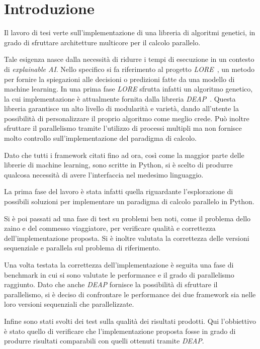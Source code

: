 \chapter*{Introduzione}

Il lavoro di tesi verte sull'implementazione di una libreria di algoritmi
genetici, in grado di sfruttare architetture multicore per il calcolo parallelo.

Tale esigenza nasce dalla necessità di ridurre i tempi di esecuzione in un
contesto di \textit{explainable AI}. Nello specifico si fa riferimento al
progetto \textit{LORE}~\cite{DBLP:journals/corr/abs-1805-10820}, un metodo per
fornire la spiegazioni alle decisioni o predizioni fatte da una modello di
machine learning. In una prima fase \textit{LORE} sfrutta infatti un algoritmo
genetico, la cui implementazione è attualmente fornita dalla libreria
\textit{DEAP}~\cite{DEAP_JMLR2012}. Questa libreria garantisce un alto livello
di modularità e varietà, dando all'utente la possibilità di personalizzare il
proprio algoritmo come meglio crede. Può inoltre sfruttare il parallelismo
tramite l'utilizzo di processi multipli ma non fornisce molto controllo
sull'implementazione del paradigma di calcolo.

Dato che tutti i framework citati fino ad ora, così come la maggior parte delle
librerie di machine learning, sono scritte in Python, si è scelto di produrre
qualcosa necessità di avere l'interfaccia nel medesimo linguaggio.

La prima fase del lavoro è stata infatti quella riguardante l'esplorazione di
possibili soluzioni per implementare un paradigma di calcolo parallelo in
Python.

Si è poi passati ad una fase di test su problemi ben noti, come il problema
dello zaino e del commesso viaggiatore, per verificare qualità e correttezza
dell'implementazione proposta. Si è inoltre valutata la correttezza delle
versioni sequenziale e parallela sul problema di riferimento.

Una volta testata la correttezza dell'implementazione è seguita una fase di
benchmark in cui si sono valutate le performance e il grado di parallelismo
raggiunto. Dato che anche \textit{DEAP} fornisce la possibilità di sfruttare il
parallelismo, si è deciso di confrontare le performance dei due framework sia
nelle loro versioni sequenziali che parallelizzate.

Infine sono stati svolti dei test sulla qualità dei risultati prodotti. Qui
l'obbiettivo è stato quello di verificare che l'implementazione proposta fosse
in grado di produrre risultati comparabili con quelli ottenuti tramite
\textit{DEAP}.